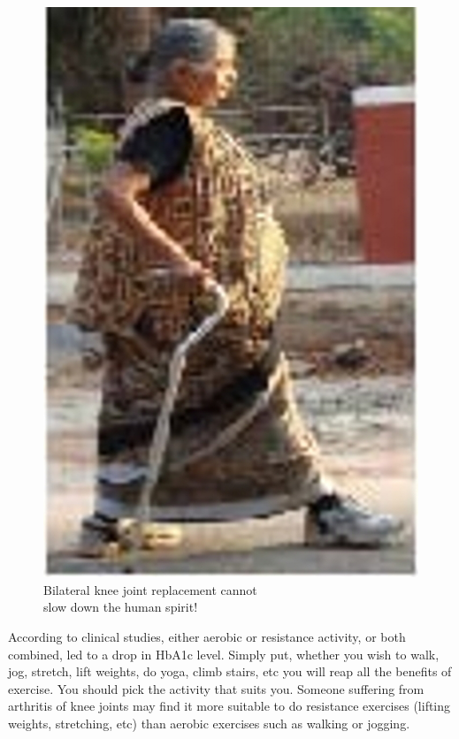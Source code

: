 \begin{figure}
\includegraphics{images/086.jpg}
\caption{Bilateral knee joint replacement cannot\\ slow down the human spirit!}
\end{figure}

According to clinical studies, either aerobic or resistance activity, or both combined, led to a drop in HbA1c level. Simply put, whether you wish to walk, jog, stretch, lift weights, do yoga, climb stairs, etc you will reap all the benefits of exercise. You should pick the activity that suits you. Someone suffering from arthritis of knee joints may find it more suitable to do resistance exercises (lifting weights, stretching, etc) than aerobic exercises such as walking or jogging.

